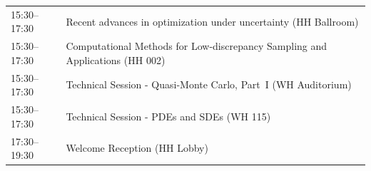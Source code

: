 \begin{table}
{\begin{tabularx}{\textwidth}{>{\hsize=0.32\hsize}X|>{\hsize=1.7\hsize}X}
\cellcolor{\SessionTitleColor}15:30--17:30 & \cellcolor{\SessionTitleColor}Recent advances in optimization under uncertainty (HH Ballroom) \\
\cellcolor{\SessionTitleColor}15:30--17:30 & \cellcolor{\SessionTitleColor}Computational Methods for Low-discrepancy Sampling and Applications (HH 002) \\
\cellcolor{\SessionLightColor}15:30--17:30 & \cellcolor{\SessionLightColor}Technical Session - Quasi-Monte Carlo, Part~I (WH Auditorium) \\
\cellcolor{\SessionLightColor}15:30--17:30 & \cellcolor{\SessionLightColor}Technical Session - PDEs and SDEs (WH 115) \\
\cellcolor{\EmptyColor}17:30--19:30 & \cellcolor{\EmptyColor}Welcome Reception (HH Lobby) \\
\hline
\end{tabularx}
}
\end{table}

